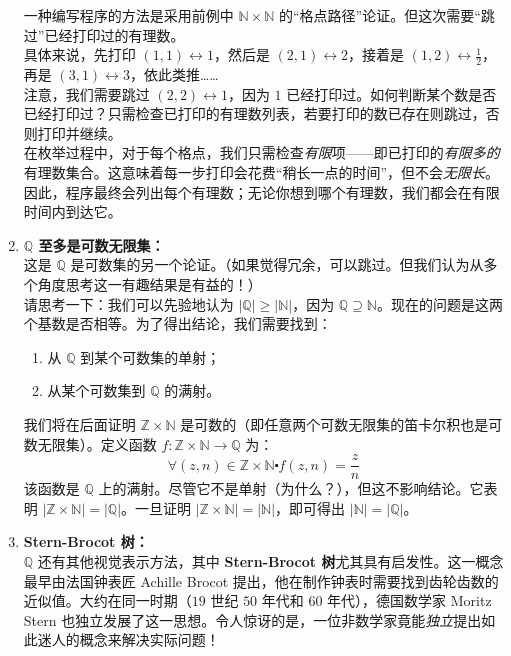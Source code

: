 \begin{example}
\begin{enumerate}[label=(\arabic*)]
              一种编写程序的方法是采用前例中 $\mathbb{N} \times \mathbb{N}$ 的``格点路径''论证。但这次需要``跳过''已经打印过的有理数。\\

              具体来说，先打印 $(1, 1) \leftrightarrow 1$，然后是 $(2, 1) \leftrightarrow 2$，接着是 $(1, 2) \leftrightarrow \frac{1}{2}$，再是 $(3, 1) \leftrightarrow 3$，依此类推……\\

              注意，我们需要跳过 $(2, 2) \leftrightarrow 1$，因为 $1$ 已经打印过。如何判断某个数是否已经打印过？只需检查已打印的有理数列表，若要打印的数已存在则跳过，否则打印并继续。\\

              在枚举过程中，对于每个格点，我们只需检查\emph{有限}项——即已打印的\emph{有限多的}有理数集合。这意味着每一步打印会花费``稍长一点的时间''，但不会\emph{无限长}。因此，程序最终会列出每个有理数；无论你想到哪个有理数，我们都会在有限时间内到达它。\\
        \item \textbf{$\mathbb{Q}$ 至多是可数无限集：}\\
              这是 $\mathbb{Q}$ 是可数集的另一个论证。（如果觉得冗余，可以跳过。但我们认为从多个角度思考这一有趣结果是有益的！）\\

              请思考一下：我们可以先验地认为 $|\mathbb{Q}| \ge |\mathbb{N}|$，因为 $\mathbb{Q} \supseteq \mathbb{N}$。现在的问题是这两个基数是否相等。为了得出结论，我们需要找到：
              \begin{enumerate}[label=(\alph*)]
                  \item 从 $\mathbb{Q}$ 到某个可数集的单射；
                  \item 从某个可数集到 $\mathbb{Q}$ 的满射。\\
              \end{enumerate}

              我们将在后面证明 $\mathbb{Z} \times \mathbb{N}$ 是可数的（即任意两个可数无限集的笛卡尔积也是可数无限集）。定义函数 $f : \mathbb{Z} \times \mathbb{N} \to \mathbb{Q}$ 为：
              \[\forall (z, n) \in \mathbb{Z} \times \mathbb{N} \centerdot f(z, n) = \frac{z}{n}\]
              该函数是 $\mathbb{Q}$ 上的满射。尽管它不是单射（为什么？），但这不影响结论。它表明 $|\mathbb{Z} \times \mathbb{N}| = |\mathbb{Q}|$。一旦证明 $|\mathbb{Z} \times \mathbb{N}| = |\mathbb{N}|$，即可得出 $|\mathbb{N}| = |\mathbb{Q}|$。\\
        \item \textbf{Stern-Brocot 树：}\\
              $\mathbb{Q}$ 还有其他视觉表示方法，其中 \textbf{Stern-Brocot 树}尤其具有启发性。这一概念最早由法国钟表匠 Achille Brocot 提出，他在制作钟表时需要找到齿轮齿数的近似值。大约在同一时期（$19$ 世纪 $50$ 年代和 $60$ 年代），德国数学家 Moritz Stern 也独立发展了这一思想。令人惊讶的是，一位非数学家竟能\emph{独立}提出如此迷人的概念来解决实际问题！\\


\end{enumerate}
\end{example}

